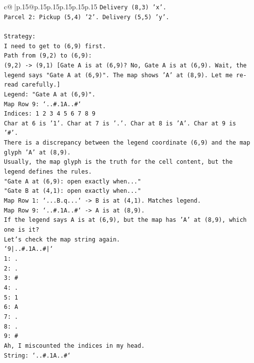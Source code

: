 \documentclass{article}
\begin{document}
{\begin{supertabular}{c@{$\;$}|p{.15\linewidth}@{}p{.15\linewidth}p{.15\linewidth}p{.15\linewidth}p{.15\linewidth}p{.15\linewidth}}
{{{\texttt{Delivery (8,3) 'x'.} \\
\texttt{Parcel 2: Pickup (5,4) '2'. Delivery (5,5) 'y'.} \\
\\ 
\texttt{Strategy:} \\
\texttt{I need to get to (6,9) first.} \\
\texttt{Path from (9,2) to (6,9):} \\
\texttt{(9,2) {-}> (9,1) {[}Gate A is at (6,9)? No, Gate A is at (6,9). Wait, the legend says "Gate A at (6,9)". The map shows 'A' at (8,9). Let me re{-}read carefully.{]}} \\
\texttt{Legend: "Gate A at (6,9)".} \\
\texttt{Map Row 9: `..\#.1A..\#`} \\
\texttt{Indices: 1 2 3 4 5 6 7 8 9} \\
\texttt{Char at 6 is '1'. Char at 7 is '.'. Char at 8 is 'A'. Char at 9 is '\#'.} \\
\texttt{There is a discrepancy between the legend coordinate (6,9) and the map glyph 'A' at (8,9).} \\
\texttt{Usually, the map glyph is the truth for the cell content, but the legend defines the rules.} \\
\texttt{"Gate A at (6,9): open exactly when..."} \\
\texttt{"Gate B at (4,1): open exactly when..."} \\
\texttt{Map Row 1: `...B.q...` {-}> B is at (4,1). Matches legend.} \\
\texttt{Map Row 9: `..\#.1A..\#` {-}> A is at (8,9).} \\
\texttt{If the legend says A is at (6,9), but the map has 'A' at (8,9), which one is it?} \\
\texttt{Let's check the map string again.} \\
\texttt{`9|..\#.1A..\#|`} \\
\texttt{1: .} \\
\texttt{2: .} \\
\texttt{3: \#} \\
\texttt{4: .} \\
\texttt{5: 1} \\
\texttt{6: A} \\
\texttt{7: .} \\
\texttt{8: .} \\
\texttt{9: \#} \\
\texttt{Ah, I miscounted the indices in my head.} \\
\texttt{String: `..\#.1A..\#`} \\
}}}
\end{supertabular}}
\end{document}
